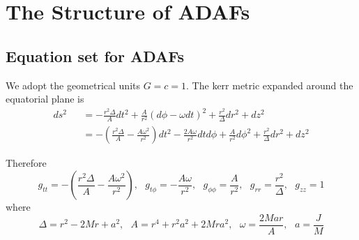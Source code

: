 \documentclass[12pt]{book}
\begin{document}
\chapter{The Structure of ADAFs}
\section{Equation set for ADAFs}
We adopt the geometrical units $G=c=1$. The kerr metric expanded around the equatorial plane is
\begin{eqnarray}
ds^2&&=-\frac{r^2\Delta}{A}dt^2+\frac{A}{r^2}(d\phi-\omega dt)^2+\frac{r^2}{\Delta}dr^2+dz^2\\
&&=-\left(\frac{r^2\Delta}{A}-\frac{A\omega^2}{r^2}\right)dt^2-\frac{2A\omega}{r^2}dtd\phi
+\frac{A}{r^2}d\phi^2+\frac{r^2}{\Delta}dr^2+dz^2
\end{eqnarray}

Therefore
%
\begin{equation}
 g_{tt}=-\left(\frac{r^2\Delta}{A}-\frac{A\omega^2}{r^2}\right),~~~
g_{t\phi}=-\frac{A\omega}{r^2},~~~g_{\phi\phi}=\frac{A}{r^2},~~~g_{rr}=\frac{r^2}{\Delta},~~~g_{zz}=1
\end{equation}
%
where
%
\begin{equation}
 \Delta=r^2-2Mr+a^2,~~~A=r^4+r^2a^2+2Mra^2,~~~\omega=\frac{2Mar}{A},~~~a=\frac{J}{M}
\end{equation}
%
\end{document}
